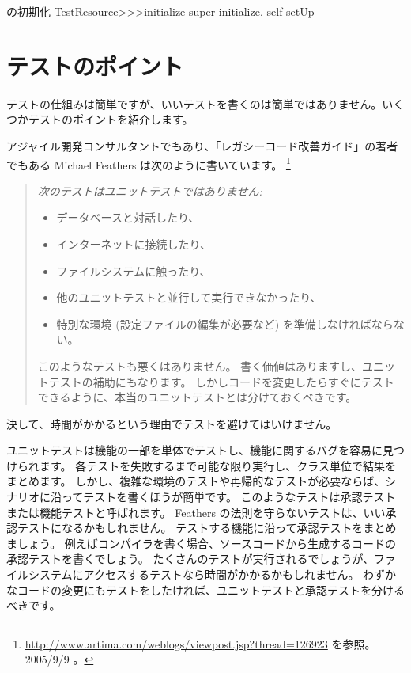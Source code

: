 \documentclass[a4paper,10pt,twoside]{book}
\begin{document}
\begin{method}[restresourceinitialize]{ の初期化}
TestResource>>>initialize
	super initialize.
	self setUp
\end{method}

\section{テストのポイント}

テストの仕組みは簡単ですが、いいテストを書くのは簡単ではありません。いくつかテストのポイントを紹介します。

\begin{description}
\item[Feathers のユニットテストの法則。]
  アジャイル開発コンサルタントでもあり、「レガシーコード改善ガイド」の著者でもある Michael Feathers は次のように書いています。 \footnote{\url{http://www.artima.com/weblogs/viewpost.jsp?thread=126923} を参照。 2005/9/9 。}
  \begin{quotation}
  \noindent
  {\it
  次のテストはユニットテストではありません:
  \begin{itemize}
	\item データベースと対話したり、
	\item インターネットに接続したり、
	\item ファイルシステムに触ったり、
	\item 他のユニットテストと並行して実行できなかったり、
	\item 特別な環境 (設定ファイルの編集が必要など) を準備しなければならない。
 \end{itemize}

このようなテストも悪くはありません。
書く価値はありますし、ユニットテストの補助にもなります。
しかしコードを変更したらすぐにテストできるように、本当のユニットテストとは分けておくべきです。

 }
  \end{quotation}

決して、時間がかかるという理由でテストを避けてはいけません。

 \item[ユニットテスト \textit{vs.}\ 承認テスト。] ユニットテストは機能の一部を単体でテストし、機能に関するバグを容易に見つけられます。
  各テストを失敗するまで可能な限り実行し、クラス単位で結果をまとめます。
  しかし、複雑な環境のテストや再帰的なテストが必要ならば、シナリオに沿ってテストを書くほうが簡単です。
  このようなテストは承認テストまたは機能テストと呼ばれます。
  Feathers の法則を守らないテストは、いい承認テストになるかもしれません。
  テストする機能に沿って承認テストをまとめましょう。
  例えばコンパイラを書く場合、ソースコードから生成するコードの承認テストを書くでしょう。
  たくさんのテストが実行されるでしょうが、ファイルシステムにアクセスするテストなら時間がかかるかもしれません。
  わずかなコードの変更にもテストをしたければ、ユニットテストと承認テストを分けるべきです。


\end{description}
\end{document}

